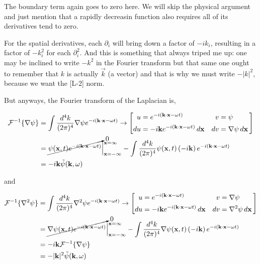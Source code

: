 The boundary term again goes to zero here.
We will skip the physical argument and just mention that a rapidly decreasin function also requires all of its derivatives
tend to zero.



For the spatial derivatives, each $\partial_i$ will bring down a factor of $-i k_i$, resulting in a factor of
$- k_{i}^2$ for each $\partial_{i}^{2}$.
And this is something that always triped me up: one may be inclined to write $-k^2$ in the Fourier transform
but that same one ought to remember that $k$ is actually $\vec{k}$ (a vector) and that is why we must
write $-|k|^2$, because we want the [L-2] norm.

But anyways, the Fourier transform of the Laplacian is,

\begin{align*}
\mathcal{F}^{-1}\{ \nabla \psi \} &=
    \int \frac{d^4k}{(2\pi)^4} \nabla \psi e^{-i(\boldsymbol{\mathbf{k}}\cdot\boldsymbol{\mathbf{x}} - \omega t)}
\rightarrow
\left[
    \begin{alignedat}{2}
        u  &= e^{-i(\boldsymbol{\mathbf{k}}\cdot\boldsymbol{\mathbf{x}} - \omega t)}                          \quad & v  &= \psi \\
        du &= -i\boldsymbol{\mathbf{k}} e^{-i(\boldsymbol{\mathbf{k}}\cdot\boldsymbol{\mathbf{x}} - \omega t)} \, d\boldsymbol{\mathbf{x}}  \quad & dv &= \nabla \psi \, d\boldsymbol{\mathbf{x}}
    \end{alignedat}\,
\right] \\
&= \cancelto{0}{ \psi(\boldsymbol{\mathbf{x}}, t) e^{-i(\boldsymbol{\mathbf{k}}\cdot\boldsymbol{\mathbf{x}} - \omega t)} } \Big|_{\boldsymbol{\mathbf{x}}=-\infty}^{\boldsymbol{\mathbf{x}}=\infty}
    - \int \frac{d^4k}{(2\pi)^4} \psi(\boldsymbol{\mathbf{x}}, t) \left(-i\boldsymbol{\mathbf{k}}\right) e^{-i(\boldsymbol{\mathbf{k}}\cdot\boldsymbol{\mathbf{x}} - \omega t)} \\
&= -i\boldsymbol{\mathbf{k}} \tilde{\psi} (\boldsymbol{\mathbf{k}}, \omega)
\end{align*}


and

\begin{align*}
\mathcal{F}^{-1}\{ \nabla^2 \psi \} &=
    \int \frac{d^4k}{(2\pi)^4} \nabla^2 \psi e^{-i(\boldsymbol{\mathbf{k}}\cdot\boldsymbol{\mathbf{x}} - \omega t)}
\rightarrow
\left[
    \begin{alignedat}{2}
        u  &= e^{-i(\boldsymbol{\mathbf{k}}\cdot\boldsymbol{\mathbf{x}} - \omega t)}                          \quad & v  &= \nabla \psi \\
        du &= -i\boldsymbol{\mathbf{k}} e^{-i(\boldsymbol{\mathbf{k}}\cdot\boldsymbol{\mathbf{x}} - \omega t)} \, d\boldsymbol{\mathbf{x}}  \quad & dv &= \nabla^2 \psi \, d\boldsymbol{\mathbf{x}}
    \end{alignedat}\,
\right] \\
&= \cancelto{0}{ \nabla\psi(\boldsymbol{\mathbf{x}}, t) e^{-i(\boldsymbol{\mathbf{k}}\cdot\boldsymbol{\mathbf{x}} - \omega t)} } \Big|_{\boldsymbol{\mathbf{x}}=-\infty}^{\boldsymbol{\mathbf{x}}=\infty}
    - \int \frac{d^4k}{(2\pi)^4} \nabla\psi(\boldsymbol{\mathbf{x}}, t) \left(-i\boldsymbol{\mathbf{k}}\right) e^{-i(\boldsymbol{\mathbf{k}}\cdot\boldsymbol{\mathbf{x}} - \omega t)} \\
&= -i\boldsymbol{\mathbf{k}} \mathcal{F}^{-1}\{ \nabla \psi \} \\
&= - |\boldsymbol{\mathbf{k}}|^2 \tilde{\psi} (\boldsymbol{\mathbf{k}}, \omega)
\end{align*}



